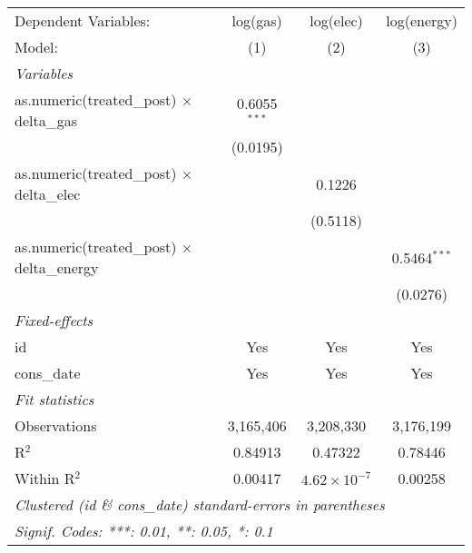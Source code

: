 
\begin{tabular}{lccc}
   \tabularnewline\midrule\midrule
   Dependent Variables:                                & log(gas)       & log(elec)             & log(energy)\\
   Model:                                              & (1)            & (2)                   & (3)\\
   \midrule \emph{Variables} &   &   &  \\
   as.numeric(treated\_post) $\times$ delta\_gas    & 0.6055$^{***}$ &                       &   \\
                                                       & (0.0195)       &                       &   \\
   as.numeric(treated\_post) $\times$ delta\_elec   &                & 0.1226                &   \\
                                                       &                & (0.5118)              &   \\
   as.numeric(treated\_post) $\times$ delta\_energy &                &                       & 0.5464$^{***}$\\
                                                       &                &                       & (0.0276)\\
   \midrule \emph{Fixed-effects} &   &   &  \\
   id                                                  & Yes            & Yes                   & Yes\\
   cons\_date                                         & Yes            & Yes                   & Yes\\
   \midrule \emph{Fit statistics} &   &   &  \\
   Observations                                        & 3,165,406      & 3,208,330             & 3,176,199\\
   R$^2$                                               & 0.84913        & 0.47322               & 0.78446\\
   Within R$^2$                                        & 0.00417        & $4.62\times 10^{-7}$ & 0.00258\\
   \midrule\midrule\multicolumn{4}{l}{\emph{Clustered (id \& cons\_date) standard-errors in parentheses}}\\
   \multicolumn{4}{l}{\emph{Signif. Codes: ***: 0.01, **: 0.05, *: 0.1}}\\
\end{tabular}


